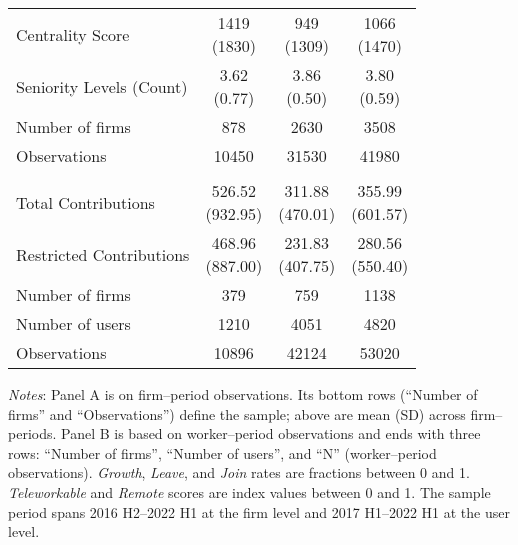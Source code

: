 \begin{table}[H]
\begin{threeparttable}
\begin{tabular}{lcc@{\hspace{6pt}}c}
Centrality Score & \makecell{1419 \\ (1830)} & \makecell{949 \\ (1309)} & \makecell{1066 \\ (1470)} \\
Seniority Levels (Count) & \makecell{3.62 \\ (0.77)} & \makecell{3.86 \\ (0.50)} & \makecell{3.80 \\ (0.59)} \\
\addlinespace
\midrule
Number of firms & 878 & 2630 & 3508 \\
Observations & 10450 & 31530 & 41980 \\
        \addlinespace
        \midrule
        \addlinespace
        \multicolumn{4}{l}{\textbf{\uline{Panel B: User-level}}}\\[0.3em]
        \midrule
Total Contributions & \makecell{526.52 \\ (932.95)} & \makecell{311.88 \\ (470.01)} & \makecell{355.99 \\ (601.57)} \\
Restricted Contributions & \makecell{468.96 \\ (887.00)} & \makecell{231.83 \\ (407.75)} & \makecell{280.56 \\ (550.40)} \\
\addlinespace
\midrule
Number of firms & 379 & 759 & 1138 \\
Number of users & 1210 & 4051 & 4820 \\
Observations & 10896 & 42124 & 53020 \\
        \bottomrule
        \end{tabular}
        \begin{tablenotes}[flushleft]
\footnotesize
\item \emph{Notes}: Panel A is on firm--period observations.  Its bottom rows (``Number of firms'' and ``Observations'') define the sample; above are mean (SD) across firm--periods.  Panel B is based on worker--period observations and ends with three rows: ``Number of firms'', ``Number of users'', and ``N'' (worker--period observations). \textit{Growth}, \textit{Leave}, and \textit{Join} rates are fractions between 0 and 1. \textit{Teleworkable} and \textit{Remote} scores are index values between 0 and 1. The sample period spans 2016 H2–2022 H1 at the firm level and 2017 H1–2022 H1 at the user level.
\end{tablenotes}
        \end{threeparttable}
        \end{table}
